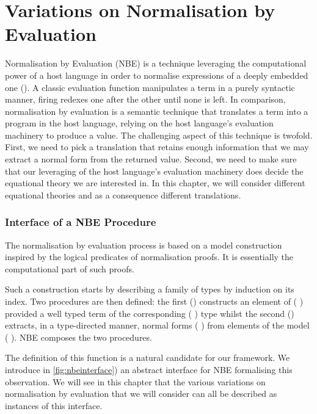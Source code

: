 \chapter{Variations on Normalisation by Evaluation}
\label{sec:variationsnormalisation}

Normalisation by Evaluation (NBE) is a technique leveraging the computational
power of a host language in order to normalise expressions of a deeply
embedded one (\cite{berger1991inverse,berger1993program,CoqDybSK,coquand2002formalised}).
A classic evaluation function manipulates a term in a purely syntactic manner,
firing redexes one after the other until none is left. In comparison,
normalisation by evaluation is a semantic technique that translates a term
into a program in the host language, relying on the host language's evaluation
machinery to produce a value. The challenging aspect of this technique is twofold.
First, we need to pick a translation that retains enough information that we
may extract a normal form from the returned value. Second, we need to make sure
that our leveraging of the host language's evaluation machinery does decide the
equational theory we are interested in. In this chapter, we will consider different
equational theories and as a consequence different translations.

\subsection{Interface of a NBE Procedure}

The normalisation by evaluation process is based on a model construction
inspired by the logical predicates of normalisation proofs. It is essentially
the computational part of such proofs.

Such a construction starts by describing a family of types  by
induction on its  index. Two procedures are then defined: the
first () constructs an element of (  )
provided a well typed term of the corresponding (  )
type whilst the second () extracts, in a type-directed manner,
normal forms (  ) from elements of the model
(  ). NBE composes the two procedures.

The definition of this  function is a natural candidate for our
 framework. We introduce in \cref{fig:nbeinterface}) an abstract
interface for NBE formalising this observation.
%
We will see in this chapter that the various variations on normalisation by
evaluation that we will consider can all be described as instances of this
 interface.

